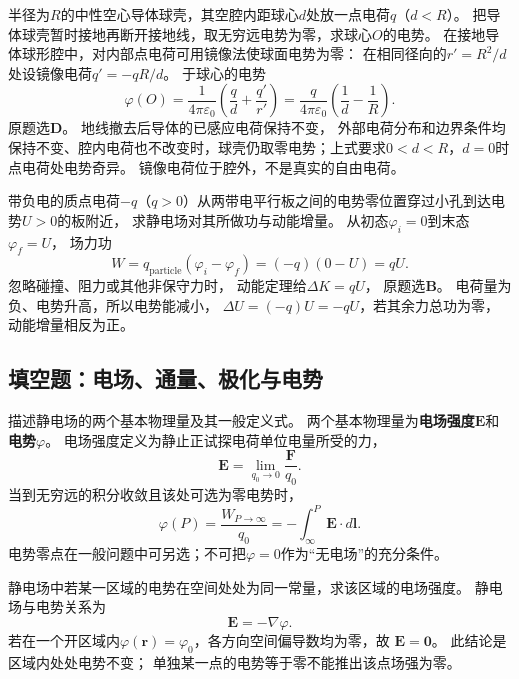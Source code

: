 \problemtext 半径为$R$的中性空心导体球壳，其空腔内距球心$d$处放一点电荷$q$（$d<R$）。
把导体球壳暂时接地再断开接地线，取无穷远电势为零，求球心$O$的电势。
\workings
在接地导体球形腔中，对内部点电荷可用镜像法使球面电势为零：
在相同径向的$r'=R^2/d$处设镜像电荷$q'=-qR/d$。
于球心的电势
\[
\varphi(O)=\frac{1}{4\pi\varepsilon_0}
\left(\frac qd+\frac{q'}{r'}\right)
=\boxed{\frac{q}{4\pi\varepsilon_0}
\left(\frac1d-\frac1R\right)}.
\]
原题选\textbf{D}。
\crosscheck 地线撤去后导体的已感应电荷保持不变，
外部电荷分布和边界条件均保持不变、腔内电荷也不改变时，球壳仍取零电势；上式要求$0<d<R$，$d=0$时点电荷处电势奇异。
镜像电荷位于腔外，不是真实的自由电荷。

\problemtext 带负电的质点电荷$-q$（$q>0$）从两带电平行板之间的电势零位置穿过小孔到达电势$U>0$的板附近，
求静电场对其所做功与动能增量。
\workings
从初态$\varphi_i=0$到末态$\varphi_f=U$，
场力功
\[
W=q_{\mathrm{particle}}(\varphi_i-\varphi_f)
=(-q)(0-U)=\boxed{qU}.
\]
忽略碰撞、阻力或其他非保守力时，
动能定理给$\boxed{\Delta K=qU}$，
原题选\textbf{B}。
\crosscheck 电荷量为负、电势升高，所以电势能减小，
$\Delta U=(-q)U=-qU$，若其余力总功为零，动能增量相反为正。

\subsection{填空题：电场、通量、极化与电势}

\problemtext 描述静电场的两个基本物理量及其一般定义式。
\workings
两个基本物理量为\textbf{电场强度$\bm E$}和\textbf{电势$\varphi$}。
电场强度定义为静止正试探电荷单位电量所受的力，
\[
\boxed{\bm E=\lim_{q_0\to0}\frac{\bm F}{q_0}}.
\]
当到无穷远的积分收敛且该处可选为零电势时，
\[
\boxed{\varphi(P)=\frac{W_{P\to\infty}}{q_0}
=-\int_\infty^P\bm E\cdot d\bm l}.
\]
\crosscheck 电势零点在一般问题中可另选；不可把$\varphi=0$作为“无电场”的充分条件。

\problemtext 静电场中若某一区域的电势在空间处处为同一常量，求该区域的电场强度。
\workings
静电场与电势关系为
\[
\boxed{\bm E=-\nabla\varphi}.
\]
若在一个开区域内$\varphi(\bm r)=\varphi_0$，各方向空间偏导数均为零，故
$\boxed{\bm E=\bm0}$。
\crosscheck 此结论是区域内处处电势不变；
单独某一点的电势等于零不能推出该点场强为零。

